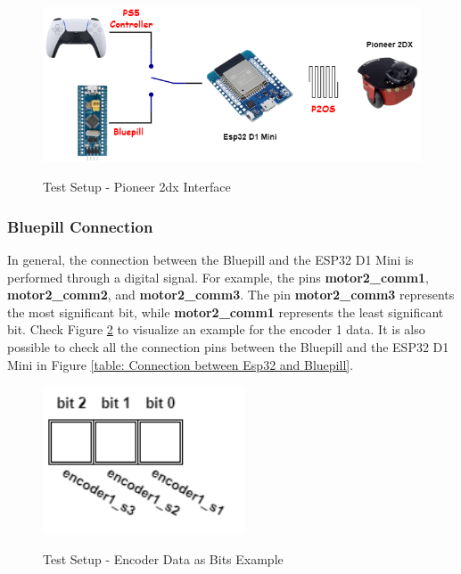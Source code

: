 \documentclass[../../../monografia.tex]{subfiles}
\begin{document}
\begin{figure}[h!]
    \caption{Test Setup - Pioneer 2dx Interface}
    \centering
    \includegraphics[width=16cm]{diagramas-test_setup-pioneer_2dx_interface.drawio.png}
    \label{fig: Test Setup - Pioneer 2dx Interface}
\end{figure}

\subsubsection{Bluepill Connection}

In general, the connection between the Bluepill and the ESP32 D1 Mini is performed through a digital signal. For example, the pins \textbf{motor2\_comm1}, \textbf{motor2\_comm2}, and \textbf{motor2\_comm3}. The pin \textbf{motor2\_comm3} represents the most significant bit, while \textbf{motor2\_comm1} represents the least significant bit. Check Figure \ref{fig: Test Setup - Encoder Data as Bits Example} to visualize an example for the encoder 1 data. It is also possible to check all the connection pins between the Bluepill and the ESP32 D1 Mini in Figure \ref{table: Connection between Esp32 and Bluepill}.

\begin{figure}[h!]
    \caption{Test Setup - Encoder Data as Bits Example}
    \centering
    \includegraphics[width=6cm]{diagramas-test_setup-pioneer_2dx_interface-bluepill.drawio.png}
    \label{fig: Test Setup - Encoder Data as Bits Example}
\end{figure}
\end{document}
